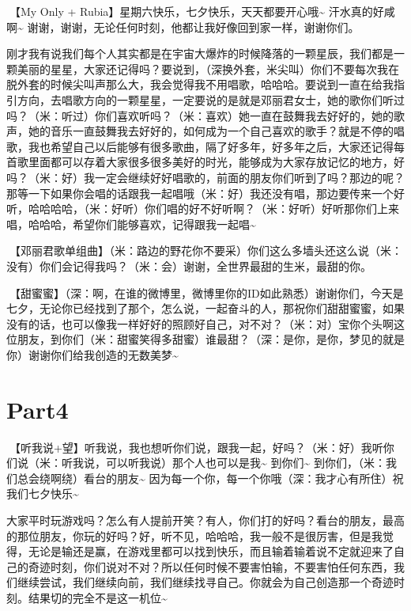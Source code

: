\documentclass[
]{book}
\begin{document}
🎵【My Only + Rubia】星期六快乐，七夕快乐，天天都要开心哦\textasciitilde{} 汗水真的好咸啊\textasciitilde{} 谢谢，谢谢，无论任何时刻，他都让我好像回到家一样，谢谢你们。

刚才我有说我们每个人其实都是在宇宙大爆炸的时候降落的一颗星辰，我们都是一颗美丽的星星，大家还记得吗？要说到，（深换外套，米尖叫）你们不要每次我在脱外套的时候尖叫声那么大，我会觉得我不用唱歌，哈哈哈。要说到一直在给我指引方向，去唱歌方向的一颗星星，一定要说的是就是邓丽君女士，她的歌你们听过吗？（米：听过）你们喜欢听吗？（米：喜欢）她一直在鼓舞我去好好的，她的歌声，她的音乐一直鼓舞我去好好的，如何成为一个自己喜欢的歌手？就是不停的唱歌，我也希望自己以后能够有很多歌曲，隔了好多年，好多年之后，大家还记得每首歌里面都可以存着大家很多很多美好的时光，能够成为大家存放记忆的地方，好吗？（米：好）我一定会继续好好唱歌的，前面的朋友你们听到了吗？那边的呢？那等一下如果你会唱的话跟我一起唱哦（米：好）我还没有唱，那边要传来一个好听，哈哈哈哈，（米：好听）你们唱的好不好听啊？（米：好听）好听那你们上来唱，哈哈哈，希望你们能够喜欢，记得跟我一起唱\textasciitilde{}

🎵【邓丽君歌单组曲】（米：路边的野花你不要采）你们这么多墙头还这么说（米：没有）你们会记得我吗？（米：会）谢谢，全世界最甜的生米，最甜的你。

🎵【甜蜜蜜】（深：啊，在谁的微博里，微博里你的ID如此熟悉）谢谢你们，今天是七夕，无论你已经找到了那个，怎么说，一起奋斗的人，那祝你们甜甜蜜蜜，如果没有的话，也可以像我一样好好的照顾好自己，对不对？（米：对）宝你个头啊这位朋友，到你们（米：甜蜜笑得多甜蜜）谁最甜？（深：是你，是你，梦见的就是你）谢谢你们给我创造的无数美梦\textasciitilde{}

\section{Part4}\label{nanjing-20240810-part4}

🎵【听我说+望】听我说，我也想听你们说，跟我一起，好吗？（米：好）我听你们说（米：听我说，可以听我说）那个人也可以是我\textasciitilde{} 到你们\textasciitilde{} 到你们，（米：我们总会绕啊绕）看台的朋友\textasciitilde{} 因为每一个你，每一个你哦（深：我才心有所住）祝我们七夕快乐\textasciitilde{}

大家平时玩游戏吗？怎么有人提前开笑？有人，你们打的好吗？看台的朋友，最高的那位朋友，你玩的好吗？好，听不见，哈哈哈，我一般不是很厉害，但是我觉得，无论是输还是赢，在游戏里都可以找到快乐，而且输着输着说不定就迎来了自己的奇迹时刻，你们说对不对？所以任何时候不要害怕输，不要害怕任何东西，我们继续尝试，我们继续向前，我们继续找寻自己。你就会为自己创造那一个奇迹时刻。结果切的完全不是这一机位\textasciitilde{}
\end{document}
